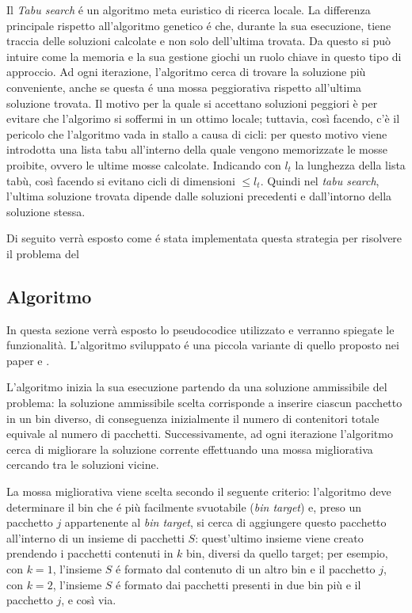 Il \textit{Tabu search} é un algoritmo meta euristico di ricerca locale. La differenza principale rispetto all'algoritmo genetico é che, durante la sua esecuzione, tiene traccia delle soluzioni calcolate e non solo dell'ultima trovata. Da questo si può intuire come la memoria e la sua gestione giochi un ruolo chiave in questo tipo di approccio. Ad ogni iterazione, l'algoritmo cerca di trovare la soluzione più conveniente, anche se questa é una mossa peggiorativa rispetto all'ultima soluzione trovata. Il motivo per la quale si accettano soluzioni peggiori è per evitare che l'algorimo si soffermi in un ottimo locale; tuttavia, così facendo, c'è il pericolo che l'algoritmo vada in stallo a causa di cicli: per questo motivo viene introdotta una lista tabu all'interno della quale vengono memorizzate le mosse proibite, ovvero le ultime mosse calcolate. Indicando con $l_t$ la lunghezza della lista tabù, così facendo si evitano cicli di dimensioni $\le l_t$. Quindi nel \textit{tabu search}, l'ultima soluzione trovata dipende dalle soluzioni precedenti e dall'intorno della soluzione stessa.
   
Di seguito verrà esposto come é stata implementata questa strategia per risolvere il problema del \ddbp

\subsection{Algoritmo}
In questa sezione verrà esposto lo pseudocodice utilizzato e verranno spiegate le funzionalità. L'algoritmo sviluppato é una piccola variante di quello proposto nei paper \cite{lmvTabu} e \cite{lmvTspack}.

L'algoritmo inizia la sua esecuzione partendo da una soluzione ammissibile del problema: la soluzione ammissibile scelta corrisponde a inserire ciascun pacchetto in un bin diverso, di conseguenza inizialmente il numero di contenitori totale equivale al numero di pacchetti. Successivamente, ad ogni iterazione l'algoritmo cerca di migliorare la soluzione corrente effettuando una mossa migliorativa cercando tra le soluzioni vicine.

La mossa migliorativa viene scelta secondo il seguente criterio: l'algoritmo deve determinare il bin che é più facilmente svuotabile (\textit{bin target}) e, preso un pacchetto $j$ appartenente al \textit{bin target}, si cerca di aggiungere questo pacchetto all'interno di un insieme di pacchetti $S$: quest'ultimo insieme viene creato prendendo i pacchetti contenuti in $k$ bin, diversi da quello target; per esempio, con $k=1$, l'insieme $S$ é formato dal contenuto di un altro bin e il pacchetto $j$, con $k=2$, l'insieme $S$ é formato dai pacchetti presenti in due bin più e il pacchetto $j$, e così via.


